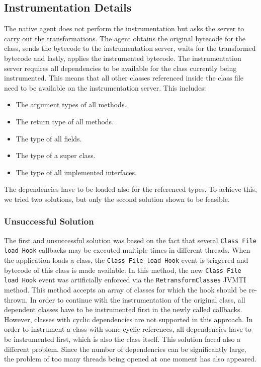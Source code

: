 \subsection{Instrumentation Details}
\label{imp:native:inst}
The native agent does not perform the instrumentation but asks the server to carry out the transformations. The agent obtains the original bytecode for the class, sends the bytecode to the instrumentation server, waits for the transformed bytecode and lastly, applies the instrumented bytecode. The instrumentation server requires all dependencies to be available for the class currently being instrumented. This means that all other classes referenced inside the class file need to be available on the instrumentation server. This includes:
\begin{itemize}
	\item The argument types of all methods.
	\item The return type of all methods.
	\item The type of all fields.
	\item The type of a super class.
	\item The type of all implemented interfaces.
\end{itemize}
The dependencies have to be loaded also for the referenced types. To achieve this, we tried two solutions, but only the second solution shown to be feasible.

\subsubsection{Unsuccessful Solution}
The first and unsuccessful solution was based on the fact that several \texttt{Class File load Hook} callbacks may be executed multiple times in different threads. When the application loads a class, the \texttt{Class File load Hook} event is triggered and bytecode of this class is made available. In this method, the new \texttt{Class File load Hook} event was artificially enforced via the \texttt{RetransformClasses} JVMTI method. This method accepts an array of classes for which the hook should be re-thrown. In order to continue with the instrumentation of the original class, all dependent classes have to be instrumented first in the newly called callbacks. However, classes with cyclic dependencies are not supported in this approach. In order to instrument a class with some cyclic references, all dependencies have to be instrumented first, which is also the class itself. This solution faced also a different problem. Since the number of dependencies can be significantly large, the problem of too many threads being opened at one moment has also appeared. 

